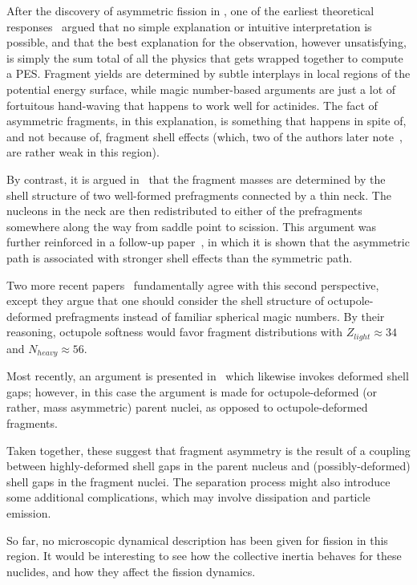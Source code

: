 After the discovery of asymmetric fission in {\Hg}, one of the earliest theoretical responses~\cite{Moller2012} argued that no simple explanation or intuitive interpretation is possible, and that the best explanation for the observation, however unsatisfying, is simply the sum total of all the physics that gets wrapped together to compute a PES. Fragment yields are determined by subtle interplays in local regions of the potential energy surface, while magic number-based arguments are just a lot of fortuitous hand-waving that happens to work well for actinides. The fact of asymmetric fragments, in this explanation, is something that happens in spite of, and not because of, fragment shell effects (which, two of the authors later note~\cite{Ichikawa2012}, are rather weak in this region).

By contrast, it is argued in~\cite{Warda2012a} that the fragment masses are determined by the shell structure of two well-formed prefragments connected by a thin neck. The nucleons in the neck are then redistributed to either of the prefragments somewhere along the way from saddle point to scission. This argument was further reinforced in a follow-up paper~\cite{Mcdonnell2014}, in which it is shown that the asymmetric path is associated with stronger shell effects than the symmetric path.

Two more recent papers~\cite{Scamps2018a, scamps2019} fundamentally agree with this second perspective, except they argue that one should consider the shell structure of octupole-deformed prefragments instead of familiar spherical magic numbers. By their reasoning, octupole softness would favor fragment distributions with $Z_{light}\approx34$ and $N_{heavy}\approx56$.

Most recently, an argument is presented in~\cite{Ichikawa2019} which likewise invokes deformed shell gaps; however, in this case the argument is made for octupole-deformed (or rather, mass asymmetric) parent nuclei, as opposed to octupole-deformed fragments.

Taken together, these suggest that fragment asymmetry is the result of a coupling between highly-deformed shell gaps in the parent nucleus and (possibly-deformed) shell gaps in the fragment nuclei. The separation process might also introduce some additional complications, which may involve dissipation and particle emission.

So far, no microscopic dynamical description has been given for fission in this region. It would be interesting to see how the collective inertia behaves for these nuclides, and how they affect the fission dynamics.

